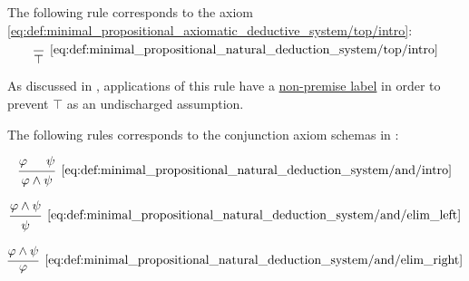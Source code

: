 \begin{definition}
\begin{thmenum}
     The following rule corresponds to the axiom \eqref{eq:def:minimal_propositional_axiomatic_deductive_system/top/intro}:
    \begin{equation*}\taglabel[\( \top^+ \)]{eq:def:minimal_propositional_natural_deduction_system/top/intro}
      \begin{prooftree}
        \infer0[\ref{eq:def:minimal_propositional_natural_deduction_system/top/intro}]{ \top }
      \end{prooftree}
    \end{equation*}

    As discussed in , applications of this rule have a \hyperref[def:proof_tree/premises]{non-premise label} in order to prevent \( \top \) as an undischarged assumption.

     The following rules corresponds to the conjunction axiom schemas in :

    \begin{minipage}{0.3\textwidth}
      \begin{equation*}\taglabel[\( \wedge^+ \)]{eq:def:minimal_propositional_natural_deduction_system/and/intro}
        \begin{prooftree}
          \hypo{ \varphi }
          \hypo{ \psi }
          \infer2[\ref{eq:def:minimal_propositional_natural_deduction_system/and/intro}]{ \varphi \wedge \psi }
        \end{prooftree}
      \end{equation*}
    \end{minipage}
    \hfill
    \begin{minipage}{0.3\textwidth}
      \begin{equation*}\taglabel[\( \wedge_L^- \)]{eq:def:minimal_propositional_natural_deduction_system/and/elim_left}
        \begin{prooftree}
          \hypo{ \varphi \wedge \psi }
          \infer1[\ref{eq:def:minimal_propositional_natural_deduction_system/and/elim_left}]{ \psi }
        \end{prooftree}
      \end{equation*}
    \end{minipage}
    \hfill
    \begin{minipage}{0.3\textwidth}
      \begin{equation*}\taglabel[\( \wedge_R^- \)]{eq:def:minimal_propositional_natural_deduction_system/and/elim_right}
        \begin{prooftree}
          \hypo{ \varphi \wedge \psi }
          \infer1[\ref{eq:def:minimal_propositional_natural_deduction_system/and/elim_right}]{ \varphi }
        \end{prooftree}
      \end{equation*}
    \end{minipage}


\end{thmenum}
\end{definition}
